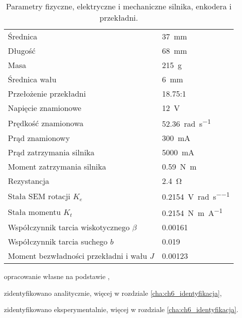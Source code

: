 \begin{table}[h]
    \centering
    \begin{threeparttable}
        \caption{Parametry fizyczne, elektryczne i mechaniczne silnika, enkodera i przekładni.}
        \label{tab:parametry_silnika}
        
        \begin{tabularx}{0.6\textwidth}{l | l}
            \toprule
            Średnica & \SI{37}{\milli\meter} \\
            Długość & \SI{68}{\milli\meter} \\
            Masa & \SI{215}{g} \\
            Średnica wału & \SI{6}{\milli\meter} \\
            \midrule
            Przełożenie przekładni & \num{18,75}:\num{1} \\
            \midrule
            Napięcie znamionowe & \SI{12}{\volt} \\
            Prędkość znamionowa & \SI{52,36}{\radian\per\second} \\
            Prąd znamionowy & \SI{300}{\milli\ampere} \\
            Prąd zatrzymania silnika & \SI{5000}{\milli\ampere} \\
            Moment zatrzymania silnika & \SI{0,59}{\newton\meter} \\
            \midrule
            Rezystancja\tnote{b} & \SI{2,4}{\ohm} \\
            Stała SEM rotacji\tnote{b} $K_e$ & \SI{0,2154}{\volt\per\radian\per\second} \\
            Stała momentu\tnote{b} $K_t$ & \SI{0,2154}{\newton\meter\per\ampere} \\
            Współczynnik tarcia wiskotycznego\tnote{b} $\beta$ & \num{0,00161} \\
            Współczynnik tarcia suchego\tnote{b} $b$ & \num{0,019} \\
            Moment bezwładności przekładni i wału\tnote{c} $J$ & \num{0,00123} \\
            \bottomrule
        \end{tabularx}
        
        \begin{tablenotes}
            \footnotesize
            \item[a] opracowanie własne na podstawie \cite{SILNIK_MANUAL},
            \item[b] zidentyfikowano analitycznie, więcej w rozdziale \ref{cha:ch6_identyfikacja},
            \item[b] zidentyfikowano eksperymentalnie, więcej w rozdziale \ref{cha:ch6_identyfikacja}.
        \end{tablenotes}
    \end{threeparttable}
\end{table}

